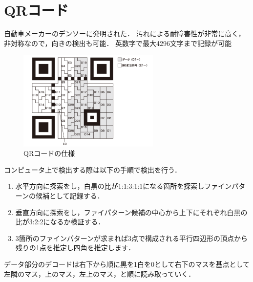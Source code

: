 \section{QRコード}
自動車メーカーのデンソーに発明された．
汚れによる耐障害性が非常に高く，非対称なので，向きの検出も可能．
英数字で最大4296文字まで記録が可能

\begin{figure}[htbp]
    \begin{center}
        \includegraphics[clip,width=7.0cm]{img/qrcode.png}
        \caption{QRコードの仕様\cite{qrcode}}
    \end{center}
\end{figure}

コンピュータ上で検出する際は以下の手順で検出を行う．
\begin{enumerate}
    \item 水平方向に探索をし，白黒の比が1:1:3:1:1になる箇所を探索しファインパターンの候補として記録する．
    \item 垂直方向に探索をし，ファイパターン候補の中心から上下にそれぞれ白黒の比が3:2:2になるか検証する．
    \item 3箇所のファインパターンが求まれば3点で構成される平行四辺形の頂点から残りの1点を推定し四角を推定します．
\end{enumerate}

データ部分のデコードは右下から順に黒を1白を0として右下のマスを基点として左隣のマス，上のマス，左上のマス，と順に読み取っていく．